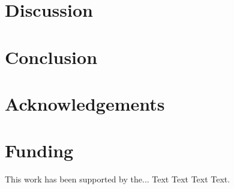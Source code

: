 \documentclass{bioinfo}
\begin{document}
\section{Discussion}







%
%






\section{Conclusion}

\vspace*{-10pt}


\section*{Acknowledgements}

\vspace*{-12pt}

\section*{Funding}

This work has been supported by the... Text Text  Text Text.\vspace*{-12pt}

%
%
%
%
%
%
%
%

\end{document}
